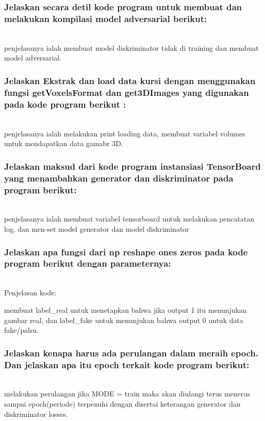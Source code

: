 \subsubsection{Jelaskan secara detil kode program untuk membuat dan melakukan kompilasi model adversarial berikut:}
\hfill\\

penjelasanya ialah membuat model diskriminator tidak di training dan membuat model adversarial.


\subsubsection{Jelaskan Ekstrak dan load data kursi dengan menggunakan fungsi getVoxelsFormat dan get3DImages yang digunakan pada kode program berikut :}
\hfill\\

penjelasanya ialah melakukan print loading data, membuat variabel volumes untuk mendapatkan data gamabr 3D. 


\subsubsection{Jelaskan maksud dari kode program instansiasi TensorBoard yang menambahkan generator dan diskriminator pada program berikut:}
\hfill\\

penjelasanya ialah membuat variabel tensorboard untuk melakukan pencatatan log, dan men-set model generator dan model diskriminator


\subsubsection{Jelaskan apa fungsi dari np reshape ones zeros pada kode program berikut dengan parameternya:}
\hfill\\
Penjelasan kode:

membuat label\_real untuk menetapkan bahwa jika output 1 itu menunjukan gambar real, dan label\_fake untuk menunjukan bahwa output 0 untuk data fake/palsu.

\subsubsection{Jelaskan kenapa harus ada perulangan dalam meraih epoch. Dan jelaskan apa itu epoch terkait kode program berikut:}
\hfill\\

melakukan perulangan jika MODE = train maka akan diulangi terus menerus sampai epoch(periode) terpenuhi dengan disertai keterangan generator dan diskriminator losses.

